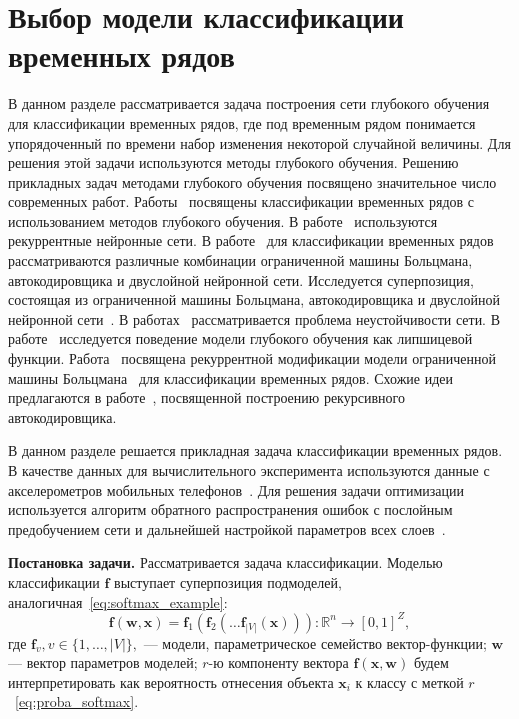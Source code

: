 \section{Выбор модели классификации временных рядов}

В данном разделе рассматривается задача построения сети глубокого обучения для классификации временных рядов, где
под временным рядом понимается упорядоченный по времени набор изменения некоторой случайной величины. Для решения этой задачи используются методы глубокого обучения. 
Решению прикладных задач методами глубокого обучения посвящено значительное число современных работ. Работы~\cite{ts1,ts2,ts3} посвящены классификации временных рядов с использованием методов глубокого обучения. В работе~\cite{ts2} используются рекуррентные нейронные сети. В работе~\cite{ts3} для классификации временных рядов рассматриваются различные комбинации ограниченной машины Больцмана, автокодировщика и двуслойной нейронной сети. Исследуется суперпозиция, состоящая из ограниченной машины Больцмана, автокодировщика и двуслойной нейронной сети~\cite{founds}. В работах~\cite{stab1,stab2} рассматривается проблема неустойчивости сети. В работе~\cite{stab1} исследуется поведение модели глубокого обучения как липшицевой функции.  Работа~\cite{recrbm} посвящена рекуррентной модификации модели ограниченной машины Больцмана~\cite{rbm} для классификации временных рядов. Схожие идеи предлагаются в работе~\cite{rae}, посвященной построению рекурсивного автокодировщика.

В данном разделе решается прикладная задача классификации временных рядов. В качестве данных для вычислительного эксперимента используются данные с акселерометров мобильных телефонов~\cite{wisdm}. Для решения задачи оптимизации используется алгоритм обратного распространения ошибок с послойным предобучением сети и дальнейшей настройкой параметров всех слоев~\cite{finetuning}.

\textbf{Постановка задачи. }
Рассматривается задача классификации. 
Моделью классификации  $\mathbf{f}$ выступает суперпозиция подмоделей, аналогичная~\eqref{eq:softmax_example}:
\begin{equation}
\label{eq:wisdm_superposition}
 \mathbf{f}(\mathbf{w}, \mathbf{x}) = \mathbf{f}_1(\mathbf{f}_2(\dots \mathbf{f}_{|V|}(\mathbf{x}))): \mathbb{R}^n \to [0,1]^Z,
\end{equation}
где $\mathbf{f}_v, v \in \{1,\dots,{|V|}\},$ --- модели, параметрическое семейство вектор-функции; $\mathbf{w}$ --- вектор параметров моделей;
$r$-ю компоненту вектора $\mathbf{f}(\mathbf{x},\mathbf{w})$ будем интерпретировать как вероятность отнесения объекта $\mathbf{x}_i$ к классу с меткой $r$~\eqref{eq:proba_softmax}.

